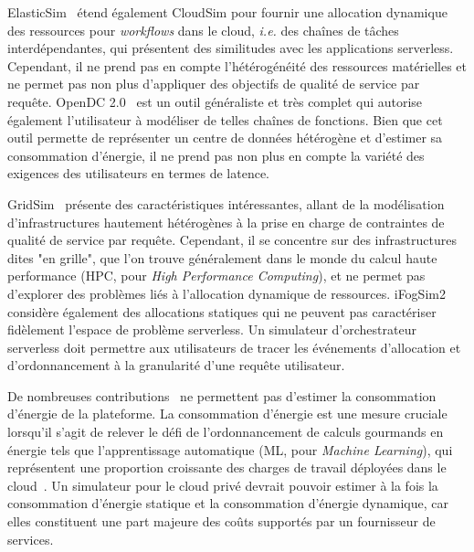 ElasticSim~\cite{cai_elasticsim_2017} étend également CloudSim pour fournir une allocation dynamique des ressources pour \textit{workflows} dans le cloud, \textit{i.e.} des chaînes de tâches interdépendantes, qui présentent des similitudes avec les applications serverless. Cependant, il ne prend pas en compte l'hétérogénéité des ressources matérielles et ne permet pas non plus d'appliquer des objectifs de qualité de service par requête. OpenDC 2.0~\cite{mastenbroekOpenDCConvenientModeling2021} est un outil généraliste et très complet qui autorise également l'utilisateur à modéliser de telles chaînes de fonctions. Bien que cet outil permette de représenter un centre de données hétérogène et d'estimer sa consommation d'énergie, il ne prend pas non plus en compte la variété des exigences des utilisateurs en termes de latence.

GridSim~\cite{buyyaGridSimToolkitModeling2002} présente des caractéristiques intéressantes, allant de la modélisation d'infrastructures hautement hétérogènes à la prise en charge de contraintes de qualité de service par requête. Cependant, il se concentre sur des infrastructures dites "en grille", que l'on trouve généralement dans le monde du calcul haute performance (\gls{HPC}, pour \textit{High Performance Computing}), et ne permet pas d'explorer des problèmes liés à l'allocation dynamique de ressources. iFogSim2~\cite{mahmudIFogSim2ExtendedIFogSim2021} considère également des allocations statiques qui ne peuvent pas caractériser fidèlement l'espace de problème serverless.
Un simulateur d'orchestrateur serverless doit permettre aux utilisateurs de tracer les événements d'allocation et d'ordonnancement à la granularité d'une requête utilisateur.

De nombreuses contributions~\cite{jeonCloudSimExtensionSimulatingDistributed2019, cai_elasticsim_2017, buyyaGridSimToolkitModeling2002, nunez_icancloud_2012} ne permettent pas d'estimer la consommation d'énergie de la plateforme. La consommation d'énergie est une mesure cruciale lorsqu'il s'agit de relever le défi de l'ordonnancement de calculs gourmands en énergie tels que l'apprentissage automatique (\gls{ML}, pour \textit{Machine Learning}), qui représentent une proportion croissante des charges de travail déployées dans le cloud~\cite{masanetRecalibratingGlobalData2020}.
Un simulateur pour le cloud privé devrait pouvoir estimer à la fois la consommation d'énergie statique et la consommation d'énergie dynamique, car elles constituent une part majeure des coûts supportés par un fournisseur de services.

